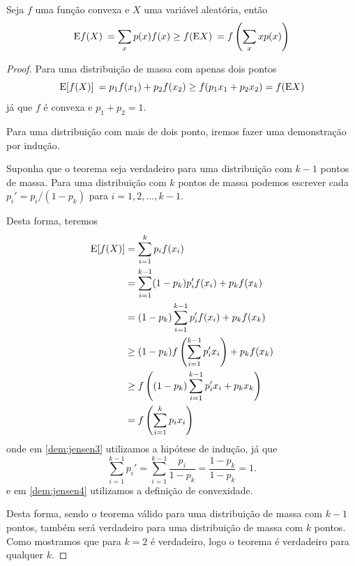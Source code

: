 \begin{theorem}\label{thm-desjensen}
Seja $f$ uma função convexa e $X$ uma variável aleatória, então
\begin{equation}\label{eq:desjensen}
\E f(X) \: = \sum_x p(x) f(x) \geq f(\E X) \: = f \left( \sum_x x p(x) \right)
\end{equation}
\end{theorem}
\begin{proof}
Para uma distribuição de massa com apenas dois pontos
\begin{equation}
\mathrm{E}[f(X)] \: = p_1 f(x_1) + p_2 f(x_2) \geq f(p_1 x_1 + p_2 x_2) = f(\mathrm{E} X)
\end{equation}
já que $f$ é convexa e $p_1+p_2=1$.

Para uma distribuição com mais de dois ponto, iremos fazer uma demonstração
por indução.

Suponha que o teorema seja verdadeiro para uma distribuição com $k-1$ pontos de massa.
Para uma distribuição com $k$ pontos de massa podemos escrever cada
$p_i' = p_i / (1-p_k)$ para $i=1,2,\ldots,k-1$.

Desta forma, teremos
\begin{subequations}\label{dem:jensen}
\begin{align}
\E[f(X)] &= \sum_{i=1}^k p_i f(x_i) \label{dem:jensen1}\\
         &= \sum_{i=1}^{k-1} (1-p_k)p_i' f(x_i) + p_k f(x_k) \label{dem:jensen2}\\
         &= (1-p_k) \sum_{i=1}^{k-1} p_i' f(x_i) + p_k f(x_k) \label{dem:jensen3}\\
	 &\geq (1-p_k) f\left( \sum_{i=1}^{k-1} p_i' x_i \right) + p_k f(x_k) \label{dem:jensen4}\\
	 &\geq f \left( (1-p_k) \sum_{i=1}^{k-1} p_i' x_i + p_k x_k \right) \\
	 &= f\left( \sum_{i=1}^{k} p_i x_i \right)
\end{align}
\end{subequations}
onde em \ref{dem:jensen3} utilizamos a hipótese de indução, já que
\begin{equation}
\sum_{i=1}^{k-1} p_i' = \sum_{i=1}^{k-1} \frac{p_i}{1-p_k} = \frac{1-p_k}{1-p_k} = 1 .
\end{equation}
e em \ref{dem:jensen4} utilizamos a definição de convexidade.

Desta forma, sendo o teorema válido para uma distribuição de massa com $k-1$ pontos,
também será verdadeiro para uma distribuição de massa com $k$ pontos.
Como mostramos que para $k=2$ é verdadeiro, logo o teorema é verdadeiro para qualquer $k$.
\end{proof}



